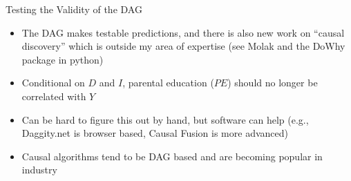 \documentclass{beamer}
\begin{document}
\begin{frame}
\begin{itemize}
\begin{itemize}
          \end{itemize}
  \end{itemize}
  \framebreak


\end{frame}


\begin{frame}{Testing the Validity of the DAG}

  \begin{itemize}
    \item The DAG makes testable predictions, and there is also new work on ``causal discovery'' which is outside my area of expertise (see Molak and the DoWhy package in python)
    \item Conditional on $D$ and $I$, parental education ($PE$) should no longer be correlated with $Y$
    \item Can be hard to figure this out by hand, but software can help (e.g., Daggity.net is browser based, Causal Fusion is more advanced)
    \item Causal algorithms tend to be DAG based and are becoming popular in industry 
  \end{itemize}

  \begin{center}
  \end{center}

\end{frame}
\end{document}
